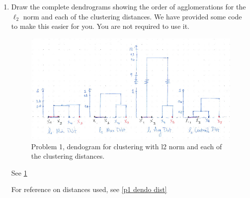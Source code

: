 \documentclass[submit]{harvardml}
\newenvironment{answer}{%
\color{answergreen}\sffamily\large}{}
\begin{document}
\begin{enumerate}
    \item Draw the complete dendrograms showing the order of agglomerations for the $\ell_2$ norm
        and each of the clustering distances. We have provided some code to make this easier for
        you. You are not required to use it.


        \begin{answer}
            \begin{figure}
                \centering
                \includegraphics[width=\textwidth]{p1_dendograms.jpg}
                \caption{Problem 1, dendogram for clustering with l2 norm and each of the clustering
                distances.}
                \label{p1 dendo}
            \end{figure}

        See \cref{p1 dendo}


        For reference on distances used, see \cref{p1 dendo dist}

		\begin{table}
			\centering
			\begin{adjustbox}{max width=\textwidth}


\end{adjustbox}
\end{table}
\end{answer}
\end{enumerate}
\end{document}
